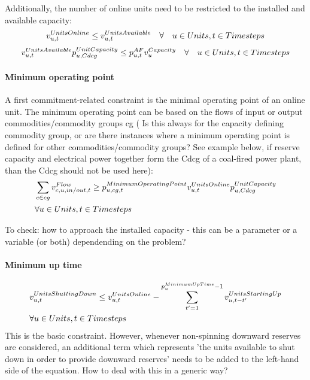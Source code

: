 \documentclass[10pt,english]{article}
\begin{document}
Additionally, the number of online units need to be restricted to the installed and available capacity:
\begin{equation} \label{eq:maximumonlineunits}
\vUnitsOnline \le \vUnitsAvailable \quad \forall \quad \units, \timesteps
\end{equation}
\begin{equation} \label{eq:availableunits}
\vUnitsAvailable \pUnitCapacity \le \pAF \vCapacity \quad \forall \quad \units, \timesteps
\end{equation}

\paragraph{Minimum operating point}
A first commitment-related constraint is the minimal operating point of an online unit. The minimum operating point can be based on the flows of input or output commodities/commodity groups cg ({\color{red}
Is this always for the capacity defining commodity group, or are there instances where a minimum operating point is defined for other commodities/commodity groups?} See example below, if reserve capacity and electrical power together form the Cdcg of a coal-fired power plant, than the Cdcg should not be used here):
\begin{align} \label{eq:minimumoperatingpoint}
&\sum_{\commodity \in cg} \vFlow \ge \pMinimumOperatingPoint \vUnitsOnline \pUnitCapacity \nonumber \\
& \forall \units, \timesteps
\end{align}

{\color{red} To check: how to approach the installed capacity - this can be a parameter or a variable (or both) dependending on the problem?}


\paragraph{Minimum up time}
\begin{align} \label{eq:minimumuptime}
&\vUnitsShuttingDown \le \vUnitsOnline - \sum_{\timestep'=1}^{\pMinimumUpTime - 1} \vUnitsStartingUp[\unit,\timestep-\timestep'] \nonumber \\
& \forall \units, \timesteps
\end{align}
{\color{red} This is the basic constraint. However, whenever non-spinning downward reserves are considered, an additional term which represents 'the units available to shut down in order to provide downward reserves' needs to be added to the left-hand side of the equation. How to deal with this in a generic way?}
\end{document}
